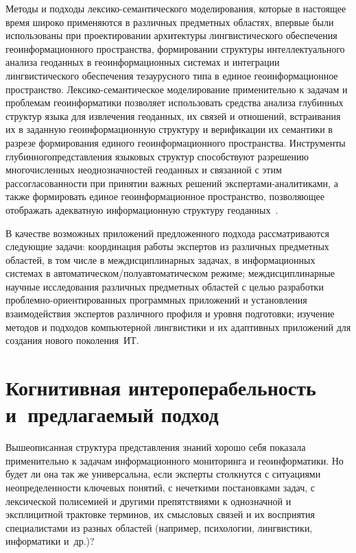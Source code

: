 \begin{multicols}{2}
     Методы и подходы лексико-семантического модели\-рования, которые в 
настоящее время широко применяются в различных предметных об\-лас\-тях, 
впервые были использованы при проектировании архитектуры 
лингвистического обеспечения геоинформационного пространства, 
форми\-ровании структуры интеллектуального анализа геодан\-ных в 
геоинформационных сис\-те\-мах и интеграции лингвистического 
обеспечения тезаурусного типа в единое геоинформационное пространство. 
Лек\-си\-ко-се\-ман\-ти\-че\-ское моделирование применительно к задачам и 
проблемам геоинформатики позволяет использовать средства анализа 
глубинных структур языка для извлечения геоданных, их связей и 
отношений, встраивания их в заданную геоинформационную структуру и 
верификации их семантики в разрезе формирования единого 
геоинформа\-ционного пространства. Инструменты глубинного\linebreak представ\-ле\-ния 
языковых структур способствуют разрешению многочисленных 
неоднозначностей геоданных и связанной с этим рассогласованности при 
принятии важных решений экс\-пер\-та\-ми-ана\-ли\-ти\-ка\-ми, а также 
формировать единое геоинформационное пространство, позволяющее 
отображать адекватную информационную структуру геоданных~\cite{23-ko}.
     
     В качестве возможных приложений предложенного подхода 
рассматриваются следующие задачи: координация работы экспертов из 
различных предмет\-ных областей, в том числе в междисциплинарных задачах, 
в информационных сис\-те\-мах в ав\-то\-ма\-ти\-че\-ском/по\-лу\-ав\-то\-ма\-ти\-че\-ском 
режиме; междисциплинарные научные исследования различных предметных 
областей с целью разработки проб\-лем\-но-ори\-ен\-ти\-ро\-ван\-ных 
программных приложений и установления взаимодействия экспертов 
различного профиля и уровня подготовки; изучение методов и подходов 
компьютерной лингвистики и их адап\-тив\-ных приложений для создания 
нового поколения~ИТ.

\section{Когнитивная интероперабельность и~предлагаемый 
подход}
     
     Вышеописанная структура представления знаний хорошо себя показала 
применительно к задачам информационного мониторинга и геоинформатики. 
Но будет ли она так же универсальна, если эксперты столкнутся с 
ситуациями неопреде\-лен\-ности ключевых понятий, с нечеткими 
постановками задач, с лексической полисемией и другими препятствиями к 
однозначной и эксплицитной трактовке терминов, их смысловых связей и их 
восприятия специалистами из разных областей (например, психологии, 
лингвистики, информатики и~др.)?
     

\end{multicols}

